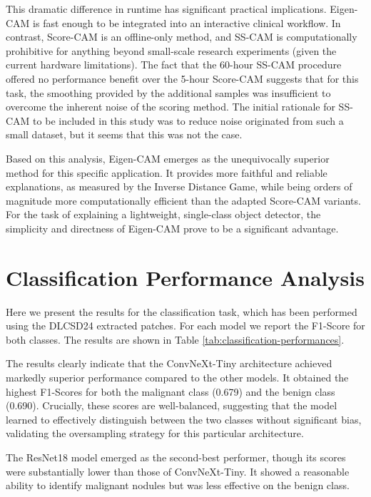 This dramatic difference in runtime has significant practical implications. Eigen-CAM is fast enough to be integrated into an interactive clinical workflow. In contrast, Score-CAM is an offline-only method, and SS-CAM is computationally prohibitive for anything beyond small-scale research experiments (given the current hardware limitations). The fact that the 60-hour SS-CAM procedure offered no performance benefit over the 5-hour Score-CAM suggests that for this task, the smoothing provided by the additional samples was insufficient to overcome the inherent noise of the scoring method. The initial rationale for SS-CAM to be included in this study was to reduce noise originated from such a small dataset, but it seems that this was not the case.

Based on this analysis, Eigen-CAM emerges as the unequivocally superior method for this specific application. It provides more faithful and reliable explanations, as measured by the Inverse Distance Game, while being orders of magnitude more computationally efficient than the adapted Score-CAM variants. For the task of explaining a lightweight, single-class object detector, the simplicity and directness of Eigen-CAM prove to be a significant advantage.


\section{Classification Performance Analysis}
Here we present the results for the classification task, which has been performed using the DLCSD24 extracted patches. For each model we report the F1-Score for both classes. The results are shown in Table \ref{tab:classification-performances}.



The results clearly indicate that the ConvNeXt-Tiny architecture achieved markedly superior performance compared to the other models. It obtained the highest F1-Scores for both the malignant class (0.679) and the benign class (0.690). Crucially, these scores are well-balanced, suggesting that the model learned to effectively distinguish between the two classes without significant bias, validating the oversampling strategy for this particular architecture.

The ResNet18 model emerged as the second-best performer, though its scores were substantially lower than those of ConvNeXt-Tiny. It showed a reasonable ability to identify malignant nodules but was less effective on the benign class.

